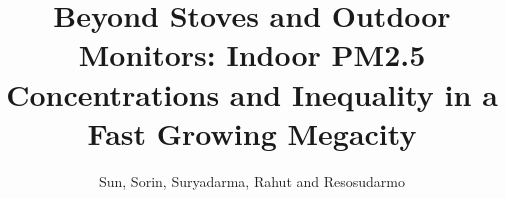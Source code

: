 \documentclass[9pt,twoside]{pnas-new}
\title{Beyond Stoves and Outdoor Monitors: Indoor PM2.5 Concentrations and Inequality in a Fast Growing Megacity}
\author{Sun, Sorin, Suryadarma, Rahut and Resosudarmo}
\begin{document}
\pagestyle{plain}
\fancyhf{}
\maketitle

\renewcommand{\thefigure}{S\arabic{figure}}
\renewcommand{\thetable}{S\arabic{table}}







\newpage
\end{document}
